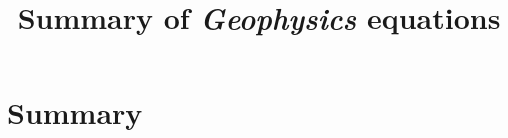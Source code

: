\documentclass{georeport}
\begin{document}
\title{Summary of \emph{Geophysics} equations}

\maketitle

\section{Summary}


\end{document}

